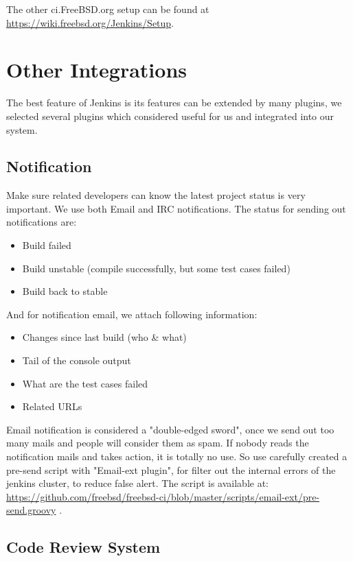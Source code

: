 \documentclass[a4paper,twocolumn,10pt]{article}
\begin{document}
The other ci.FreeBSD.org setup can be found at
\url{https://wiki.freebsd.org/Jenkins/Setup}.

\section{Other Integrations}

The best feature of Jenkins is its features can be extended by many plugins, we
selected several plugins which considered useful for us and integrated into our
system.

\subsection{Notification}

Make sure related developers can know the latest project status is very
important. We use both Email and IRC notifications. The status for sending out
notifications are:

\begin{itemize}
\item Build failed
\item Build unstable (compile successfully, but some test cases failed)
\item Build back to stable
\end{itemize}

And for notification email, we attach following information:
\begin{itemize}
\item Changes since last build (who \& what)
\item Tail of the console output
\item What are the test cases failed
\item Related URLs
\end{itemize}

Email notification is considered a "double-edged sword", once we send out too
many mails and people will consider them as spam. If nobody reads the
notification mails and takes action, it is totally no use. So use carefully
created a pre-send script with "Email-ext plugin", for filter out the internal
errors of the jenkins cluster, to reduce false alert. The script is available
at:
\url{https://github.com/freebsd/freebsd-ci/blob/master/scripts/email-ext/pre-send.groovy}
.

\subsection{Code Review System}
\end{document}
